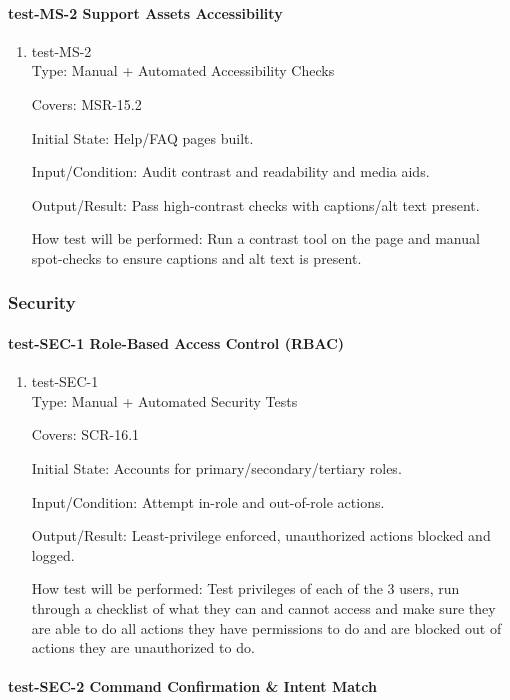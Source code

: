 \documentclass[12pt, titlepage]{article}
\begin{document}
\paragraph{test-MS-2 Support Assets Accessibility}

\begin{enumerate}
\item{test-MS-2\\}
Type: Manual + Automated Accessibility Checks

Covers: MSR-15.2

Initial State: Help/FAQ pages built.

Input/Condition: Audit contrast and readability and media aids.

Output/Result: Pass high-contrast checks with captions/alt text present.

How test will be performed: Run a contrast tool on the page and manual spot-checks to ensure captions and alt text is present.
\end{enumerate}

\subsubsection{Security}

\paragraph{test-SEC-1 Role-Based Access Control (RBAC)}

\begin{enumerate}
\item{test-SEC-1\\}
Type: Manual + Automated Security Tests

Covers: SCR-16.1

Initial State: Accounts for primary/secondary/tertiary roles.

Input/Condition: Attempt in-role and out-of-role actions.

Output/Result: Least-privilege enforced, unauthorized actions blocked and logged.

How test will be performed: Test privileges of each of the 3 users, run through a checklist of what they can and cannot access and make sure they are able to do all actions they have permissions to do and are blocked out of actions they are unauthorized to do.
\end{enumerate}

\paragraph{test-SEC-2 Command Confirmation \& Intent Match}
\end{document}
